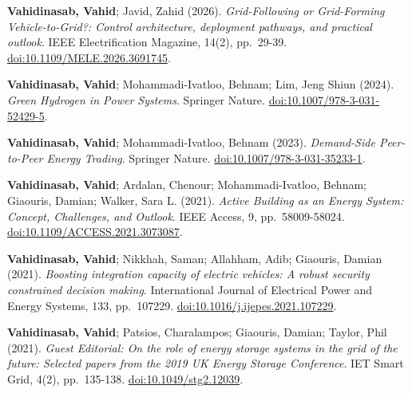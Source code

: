 
\begin{cvbullets}
  \item \textbf{Vahidinasab, Vahid}; Javid, Zahid (2026). \emph{Grid-Following or Grid-Forming Vehicle-to-Grid?: Control architecture, deployment pathways, and practical outlook}. IEEE Electrification Magazine, 14(2), pp.~29-39. \href{https://doi.org/10.1109/MELE.2026.3691745}{doi:10.1109/MELE.2026.3691745}.
  \item \textbf{Vahidinasab, Vahid}; Mohammadi-Ivatloo, Behnam; Lim, Jeng Shiun (2024). \emph{Green Hydrogen in Power Systems}. Springer Nature. \href{https://doi.org/10.1007/978-3-031-52429-5}{doi:10.1007/978-3-031-52429-5}.
  \item \textbf{Vahidinasab, Vahid}; Mohammadi-Ivatloo, Behnam (2023). \emph{Demand-Side Peer-to-Peer Energy Trading}. Springer Nature. \href{https://doi.org/10.1007/978-3-031-35233-1}{doi:10.1007/978-3-031-35233-1}.
  \item \textbf{Vahidinasab, Vahid}; Ardalan, Chenour; Mohammadi-Ivatloo, Behnam; Giaouris, Damian; Walker, Sara L. (2021). \emph{Active Building as an Energy System: Concept, Challenges, and Outlook}. IEEE Access, 9, pp.~58009-58024. \href{https://doi.org/10.1109/ACCESS.2021.3073087}{doi:10.1109/ACCESS.2021.3073087}.
  \item \textbf{Vahidinasab, Vahid}; Nikkhah, Saman; Allahham, Adib; Giaouris, Damian (2021). \emph{Boosting integration capacity of electric vehicles: A robust security constrained decision making}. International Journal of Electrical Power and Energy Systems, 133, pp.~107229. \href{https://doi.org/10.1016/j.ijepes.2021.107229}{doi:10.1016/j.ijepes.2021.107229}.
  \item \textbf{Vahidinasab, Vahid}; Patsios, Charalampos; Giaouris, Damian; Taylor, Phil (2021). \emph{Guest Editorial: On the role of energy storage systems in the grid of the future: Selected papers from the 2019 UK Energy Storage Conference}. IET Smart Grid, 4(2), pp.~135-138. \href{https://doi.org/10.1049/stg2.12039}{doi:10.1049/stg2.12039}.
\end{cvbullets}
